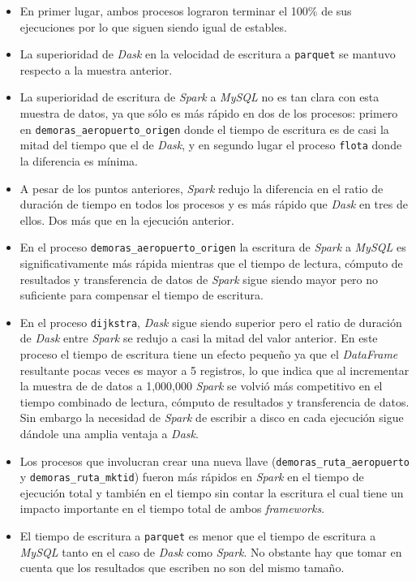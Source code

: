 \begin{itemize}
	\item En primer lugar, ambos procesos lograron terminar el 100\% de sus ejecuciones por lo que siguen siendo igual de estables.
	\item La superioridad de \textit{Dask} en la velocidad de escritura a \texttt{parquet} se mantuvo respecto a la muestra anterior.
	\item La superioridad de escritura de \textit{Spark} a \textit{MySQL} no es tan clara con esta muestra de datos, ya que sólo es más rápido en dos de los procesos: primero en \texttt{demoras\_aeropuerto\_origen} donde el tiempo de escritura es de casi la mitad del tiempo que el de \textit{Dask}, y en segundo lugar el proceso \texttt{flota} donde la diferencia es mínima.
	\item A pesar de los puntos anteriores, \textit{Spark} redujo la diferencia en el ratio de duración de tiempo en todos los procesos y es más rápido que \textit{Dask} en tres de ellos. Dos más que en la ejecución anterior.
	\item En el proceso \texttt{demoras\_aeropuerto\_origen} la escritura de \textit{Spark} a \textit{MySQL} es significativamente más rápida mientras que el tiempo de lectura, cómputo de resultados y transferencia de datos de \textit{Spark} sigue siendo mayor pero no suficiente para compensar el tiempo de escritura.
	\item En el proceso \texttt{dijkstra}, \textit{Dask} sigue siendo superior pero el ratio de duración de \textit{Dask} entre \textit{Spark} se redujo a casi la mitad del valor anterior. En este proceso el tiempo de escritura tiene un efecto pequeño ya que el \textit{DataFrame} resultante pocas veces es mayor a 5 registros, lo que indica que al incrementar la muestra de de datos a 1,000,000 \textit{Spark} se volvió más competitivo en el tiempo combinado de lectura, cómputo de resultados y transferencia de datos. Sin embargo la necesidad de \textit{Spark} de escribir a disco en cada ejecución sigue dándole una amplia ventaja a \textit{Dask}.
	\item Los procesos que involucran crear una nueva llave (\texttt{demoras\_ruta\_aeropuerto} y \texttt{demoras\_ruta\_mktid}) fueron más rápidos en \textit{Spark} en el tiempo de ejecución total y también en el tiempo sin contar la escritura el cual tiene un impacto importante en el tiempo total de ambos \textit{frameworks}.
	\item El tiempo de escritura a \texttt{parquet} es menor que el tiempo de escritura a \textit{MySQL} tanto en el caso de \textit{Dask} como \textit{Spark}. No obstante hay que tomar en cuenta que los resultados que escriben no son del mismo tamaño.
\end{itemize}


